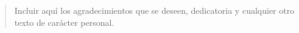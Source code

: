 \renewcommand{\abstractname}{Agradecimientos}
\begin{abstract}
Incluir aquí los agradecimientos que se deseen, dedicatoria y cualquier otro texto de carácter personal.
\end{abstract}
